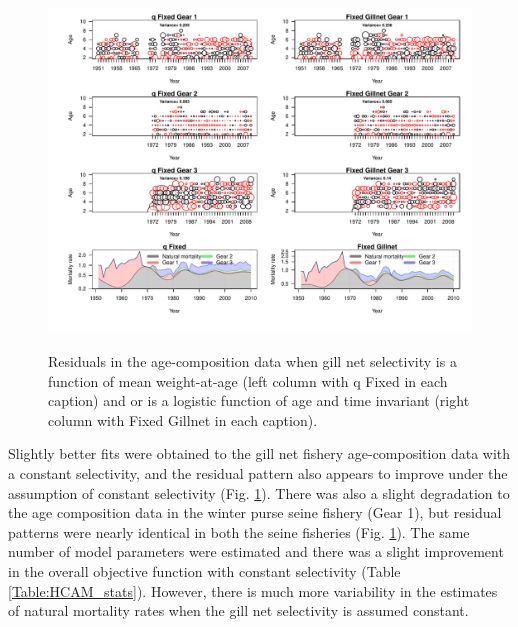 \begin{figure}[!tbp]
	\includegraphics[width=\textwidth]{../FIGS/iscam_fig_HCAM_Ares_qFix_GillFix.pdf}\\
	\caption{Residuals in the age-composition data when gill net selectivity is a function of mean weight-at-age (left column with q Fixed in each caption) and or is a logistic function of age and time invariant (right column with Fixed Gillnet in each caption).}\label{fig:qFix_GillFix}
\end{figure}

Slightly better fits were obtained to the gill net fishery age-composition data with a constant selectivity, and the residual pattern also appears to improve under the assumption of constant selectivity (Fig. \ref{fig:qFix_GillFix}).  There was also a slight degradation to the age composition data in the winter purse seine fishery (Gear 1), but residual patterns were nearly identical in both the seine fisheries (Fig. \ref{fig:qFix_GillFix}).  The same number of model parameters were estimated and there was a slight improvement in the overall objective function with constant selectivity (Table \ref{Table:HCAM_stats}).  However, there is much more variability in the estimates of natural mortality rates when the gill net selectivity is assumed constant.


	
	
